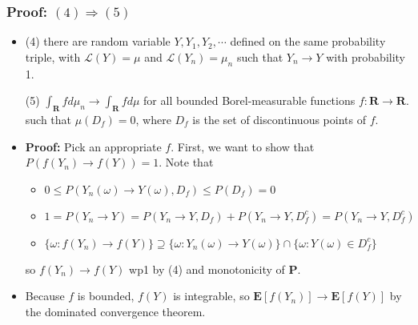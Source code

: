 \documentclass[handout]{beamer}
\newcommand{\BP}{\mathbf{P}}
\newcommand{\BE}{\mathbf{E}}
\begin{document}
\frame
{
  \frametitle{Proof: $(4) \Rightarrow (5)$ } 

   \begin{itemize}

\item<1->
               


               (4) there are random variable $Y, Y_1, Y_2, \cdots$ defined on the same probability triple, with $\mathcal{L} (Y)=\mu$ and $\mathcal{L} (Y_n)=\mu_n $ such that $Y_n\rightarrow Y$ with probability 1.
                                                           \vspace{2mm}
                                                           
                                                           

            {\color{blue}   (5) $\int_{\mathbf{R}}f d\mu_n \rightarrow \int_{\mathbf{R}}f d\mu$ for all bounded Borel-measurable functions $f:\mathbf{R}\rightarrow \mathbf{R}$. such that $\mu(D_f)=0$, where $D_f$ is the set of discontinuous points of $f$. }
              
                                            \vspace{2mm}

               
\item<2-> \textbf{Proof:} Pick an appropriate $f$. First, we want to show that $P\left( f(Y_n) \to f(Y) \right) = 1$. Note that
\begin{itemize}
\item $0 \le P(Y_n(\omega) \to Y(\omega), D_f) \le P( D_f) = 0$
\item$1 = P(Y_n \to Y) = P(Y_n \to Y, D_f) + P(Y_n \to Y, D_f^c) =  P(Y_n \to Y, D_f^c)$
\item $\{\omega : f(Y_n) \to f(Y)\} \supseteq \{\omega :  Y_n(\omega) \to Y(\omega)\} \cap \{\omega :  Y(\omega) \in D_f^c \}$
\end{itemize}
so $f(Y_n) \to f(Y)$ wp1 by (4) and monotonicity of $\BP$.

\item<3->[-] Because $f$ is bounded, $f(Y)$ is integrable, so $\BE[f(Y_n)]\rightarrow \BE[f(Y)]$ by the dominated convergence theorem.

\end{itemize}
}
\end{document}
